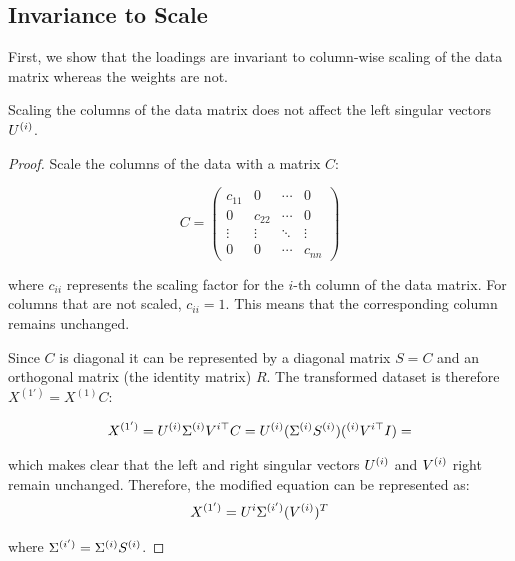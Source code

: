 \subsection{Invariance to Scale}\label{subsubsec:invariance-to-scale}

First, we show that the \gls{loadings} are invariant to column-wise scaling of the data matrix whereas the weights are not.

\begin{lemma}
    Scaling the columns of the data matrix does not affect the left singular vectors $U^{(i)}$.
\end{lemma}

\begin{proof}
    Scale the columns of the data with a matrix \( C \):

    \begin{equation}
        C = \begin{pmatrix}
                c_{11} & 0      & \cdots & 0      \\
                0      & c_{22} & \cdots & 0      \\
                \vdots & \vdots & \ddots & \vdots \\
                0      & 0      & \cdots & c_{nn}
        \end{pmatrix}
    \end{equation}

    where \( c_{ii} \) represents the scaling factor for the \( i \)-th column of the data matrix. For columns that are not scaled, \( c_{ii} = 1 \).
    This means that the corresponding column remains unchanged.

    Since $C$ is diagonal it can be represented by a diagonal matrix $S=C$ and an orthogonal matrix (the identity matrix) $R$.
    The transformed dataset is therefore \( X^{(1')} = X^{(1)}C \):

    \begin{align}
        X^{(1')} = U^{(i)}\Sigma^{(i)}V^{i\top}C = U^{(i)}(\Sigma^{(i)} S^{(i)}) (^{(i)}V^{i\top}I) =  \label{eq:scaled_data}
    \end{align}

    which makes clear that the left and right singular vectors \( U^{(i)} \) and \( V^{(i)} \) right remain unchanged.
    Therefore, the modified equation can be represented as:
    \begin{equation}
        X^{(1')} = U^i \Sigma^{(i')} (V^{(i)})^T \label{eq:modified_svd}
    \end{equation}

    where $\Sigma^{(i')}=\Sigma^{(i)} S^{(i)}$.
\end{proof}

